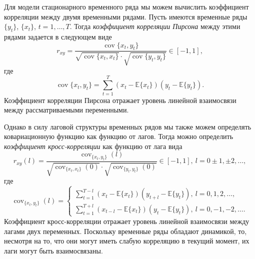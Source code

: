 \documentclass[a4paper, 14pt]{extreport}
\numberwithin{equation}{section}
\newcommand{\cov}{\operatorname{cov}}
\newcommand{\E}{\mathbb E}
\numberwithin{equation}{section}
\begin{document}
	Для модели стационарного временного ряда мы можем вычислить коэффициент корреляции между двумя временными рядами. Пусть имеются временные ряды $\{y_t\}$, $\{x_t\}$, $t = 1,\ldots, T$. Тогда \textit{коэффициент корреляции Пирсона} между этими рядами задается в следующем виде
	\begin{equation}
		\label{eq:corr}
		r_{xy} = \dfrac{\cov\{x_t,y_t\}}{\sqrt{\cov\{x_t,x_t\}}\cdot \sqrt{\cov\{y_t, y_t\}}}\in [-1, 1],
	\end{equation}
	где \begin{equation}
		\cov\{x_t,y_t\} = \sum_{t=1}^{T}(x_t - \E \{x_t\}) (y_t - \E\{y_t\}).
	\end{equation}
	Коэффициент корреляции Пирсона отражает уровень линейной взаимосвязи между рассматриваемыми переменными. 
	
	Однако в силу лаговой структуры временных рядов мы также можем определять ковариационную функцию как функцию от лагов. Тогда можно определить \textit{коэффициент кросс-корреляции} как функцию от лага вида
	\begin{equation}
		\label{eq:cross-corr}
		r_{xy}(l) = \dfrac{\cov_{\{x_t,y_t\}}(l)}{\sqrt{\cov_{\{x_t,x_t\}}(0)}\cdot \sqrt{\cov_{\{y_t, y_t\}}(0)}}\in [-1, 1],\ l=0\pm1,\pm2,\ldots,
	\end{equation}
	где
	\begin{equation}
		\cov_{\{x_t,y_t\}}(l) = \begin{cases}
			\sum\limits_{t=1}^{T-l}(x_t - \E \{x_t\}) (y_{t+l} - \E\{y_t\}),\ l=0,1,2,\ldots,\\
			\sum\limits_{t=1}^{T+l}(x_{t-l} - \E \{x_t\}) (y_t - \E\{y_t\}),\ l=0,-1,-2,\ldots.
		\end{cases}
	\end{equation}
	Коэффициент кросс-корреляции отражает уровень линейной взаимосвязи между лагами двух переменных. Поскольку временные ряды обладают динамикой, то, несмотря на то, что они могут иметь слабую корреляцию в текущий момент, их лаги могут быть взаимосвязаны.
	
\end{document}
